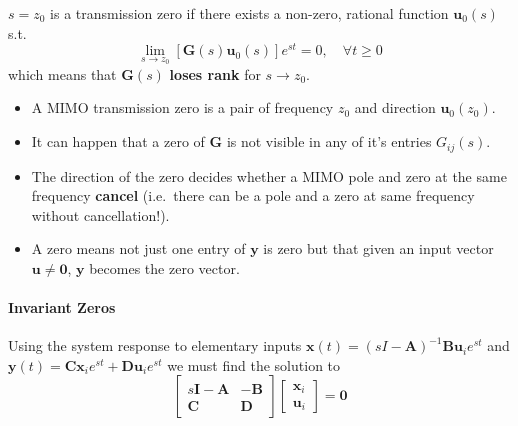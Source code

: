 $s = z_0$ is a transmission zero if there exists a non-zero, rational function $\mathbf{u}_0(s)$ s.t.
\begin{equation*}
    \lim_{s\to z_0}\left[\mathbf{G}(s)\mathbf{u}_0(s)\right]e^{st}=0,\quad\forall t\geq0
\end{equation*}
which means that $\mathbf{\mathbf{G}}(s)$ \textbf{loses rank} for $s\rightarrow z_0$.


\begin{itemize}
    \item A MIMO transmission zero is a pair of frequency $z_0$ and direction $\mathbf{u}_0(z_0)$.
    \item It can happen that a zero of $\mathbf{G}$ is not visible in any of it's entries $G_{ij}(s)$.
    \item The direction of the zero decides whether a MIMO pole and zero at the same frequency \textbf{cancel} (i.e.\ there can be a pole and a zero at same frequency without cancellation!).
    \item A zero means not just one entry of $\mathbf{y}$ is zero but that given an input vector $\mathbf{u} \ne \mathbf{0}$, $\mathbf{y}$ becomes the zero vector.
\end{itemize}

\paragraph{Invariant Zeros}

Using the system response to elementary inputs $\mathbf{x}(t)={(sI-\mathbf{A})}^{-1}\mathbf{Bu}_i e^{st}$ and $\mathbf{y}(t)=\mathbf{Cx}_i e^{st}+\mathbf{Du}_i e^{st}$ we must find the solution to
\begin{equation*}
    \begin{bmatrix}
        s\mathbf{I}-\mathbf{A} & -\mathbf{B} \\
        \mathbf{C}             & \mathbf{D}
    \end{bmatrix}
    \begin{bmatrix}
        \mathbf{x}_i \\
        \mathbf{u}_i
    \end{bmatrix}=\mathbf{0}
\end{equation*}



